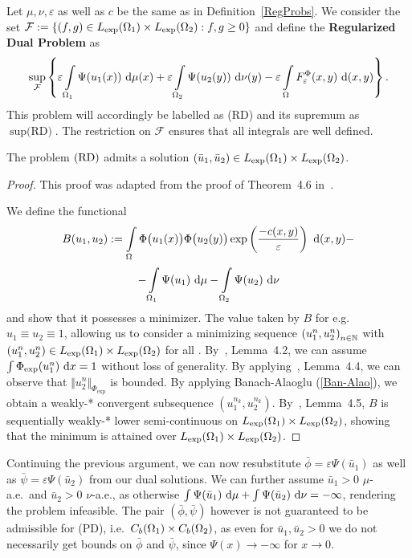 \begin{definition}\label{RegDualProb}
	Let $\mu, \nu, \varepsilon$ as well as $c$ be the same as in Definition~\ref{RegProbs}. We consider the set $\mathcal{F} := \{ (f, g) \in \Lexp[\Omega_1] \times \Lexp[\Omega_2] : f, g \ge 0 \}$ and define the \textbf{Regularized Dual Problem} as
	\[ \sup\limits_{\mathcal{F}} \left\{ \varepsilon \int\limits_{\Omega_1} \Psi(u_1(x))~\Dx{\mu} + \varepsilon \int\limits_{\Omega_2} \Psi(u_2(y))~\Dx[y]{\nu} - \varepsilon \int\limits_{\Omega} F_{\varepsilon}^{\Phi}(x, y)~\Dx[x, y]{} \right\}. \]
	This problem will accordingly be labelled as (RD) and its supremum as $\sup \text{(RD)}$. The restriction on $\mathcal{F}$ ensures that all integrals are well defined.
\end{definition}

\begin{theorem}\label{RegDualAdmit}
	The problem$\text{\normalfont\ (RD)}$ admits a solution $(\bar{u}_1, \bar{u}_2) \in \Lexp[\Omega_1] \times \Lexp[\Omega_2]$.
\end{theorem}

\begin{proof}
	This proof was adapted from the proof of Theorem~4.6 in~\cite{Cla2021}.
	
	We define the functional
	\[ B(u_1, u_2) := \int\limits_{\Omega} \Phi\big( u_1(x) \big) \Phi\big( u_2(y) \big) \exp\left( \frac{-c(x, y)}{\varepsilon} \right)~\D[(x, y)] - \]
	\[ - \int\limits_{\Omega_1} \Psi(u_1)~\D - \int\limits_{\Omega_2} \Psi(u_2)~\D[\nu] \]
	and show that it possesses a minimizer. The value taken by $B$ for e.g.\ $u_1 \equiv u_2 \equiv 1$, allowing us to consider a minimizing sequence ${(u_1^n, u_2^n)}_{\NinN}$ with $(u_1^n, u_2^n) \in \Lexp[\Omega_1] \times \Lexp[\Omega_2]$ for all \NinN. By\ \cite{Cla2021}, Lemma~4.2, we can assume $\int \Phi_{\exp}(u_1^n)~\D[x] = 1$ without loss of generality. By applying\ \cite{Cla2021}, Lemma~4.4, we can observe that $\Vert u_2^n \Vert_{\Phi_{\exp}}$ is bounded. By applying Banach-Alaoglu (\ref{Ban-Alao}), we obtain a weakly-* convergent subsequence $(u_1^{n_k}, u_2^{n_k})$. By\ \cite{Cla2021}, Lemma~4.5, $B$ is sequentially weakly-* lower semi-continuous on $\Lexp[\Omega_1] \times \Lexp[\Omega_2]$, showing that the minimum is attained over $\Lexp[\Omega_1] \times \Lexp[\Omega_2]$.
\end{proof}

Continuing the previous argument, we can now resubstitute $\bar{\phi} = \varepsilon \Psi(\bar{u}_1)$ as well as $\bar{\psi} = \varepsilon \Psi(\bar{u}_2)$ from our dual solutions. We can further assume $\bar{u}_1 > 0$ $\mu$-a.e.\ and $\bar{u}_2 > 0$ $\nu$-a.e., as otherwise $\int \Psi(\bar{u}_1)~\D + \int \Psi(\bar{u}_2)~\D[\nu] = -\infty$, rendering the problem infeasible. The pair $(\bar{\phi}, \bar{\psi})$ however is not guaranteed to be admissible for (PD), i.e.~$\CF[b]{\Omega_1} \times \CF[b]{\Omega_2}$, as even for $\bar{u}_1, \bar{u}_2 > 0$ we do not necessarily get bounds on $\bar{\phi}$ and $\bar{\psi}$, since $\Psi(x) \rightarrow -\infty$ for $x \rightarrow 0$.

